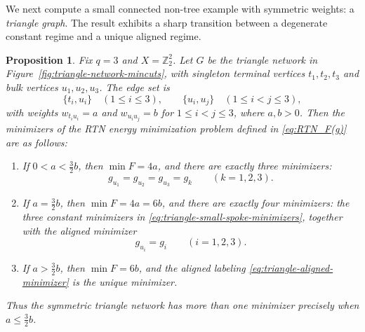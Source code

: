 \documentclass[11pt,oneside,letterpaper]{article}
\numberwithin{equation}{section}
\newtheorem{proposition}[theorem]{Proposition}
\theoremstyle{definition}
\theoremstyle{remark}
\begin{document}
We next compute a small connected non-tree example with symmetric
weights: a \emph{triangle graph}.  The result exhibits a sharp
transition between a degenerate constant regime and a unique aligned
regime.

\begin{proposition}
Fix $q=3$ and $X=\mathbb{Z}_2^2$.  Let $G$ be the triangle network in
Figure~\ref{fig:triangle-network-mincuts}, with singleton terminal
vertices $t_1,t_2,t_3$ and bulk vertices $u_1,u_2,u_3$.
The edge set is
\begin{equation}
\{t_i,u_i\}\quad (1\le i\le 3),
\qquad
\{u_i,u_j\}\quad (1\le i<j\le 3),
\end{equation}
with weights $w_{t_i u_i}=a$ and $w_{u_i u_j}=b$ for $1\le i<j\le 3$,
where $a,b>0$.
Then the minimizers of the RTN energy minimization problem defined
in \eqref{eq:RTN_F(g)} are as follows:

\begin{enumerate}
\item If $0<a<\frac32 b$, then $\min F=4a$, and there are exactly
three minimizers:
\begin{equation}\label{eq:triangle-small-spoke-minimizers}
g_{u_1}=g_{u_2}=g_{u_3}=g_k
\qquad (k=1,2,3).
\end{equation}

\item If $a=\frac32 b$, then $\min F=4a=6b$, and there are exactly four
minimizers: the three constant minimizers in
\eqref{eq:triangle-small-spoke-minimizers}, together with the aligned
minimizer
\begin{equation}\label{eq:triangle-aligned-minimizer}
g_{u_i}=g_i
\qquad (i=1,2,3).
\end{equation}

\item If $a>\frac32 b$, then $\min F=6b$, and the aligned labeling
\eqref{eq:triangle-aligned-minimizer} is the unique minimizer.
\end{enumerate}

Thus the symmetric triangle network has more than one minimizer
precisely when $a\le \frac32 b$.
\end{proposition}
\end{document}
